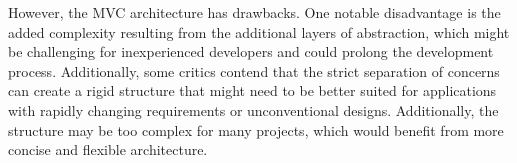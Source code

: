 However, the MVC architecture has drawbacks. One notable disadvantage is the
added complexity resulting from the additional layers of abstraction, which
might be challenging for inexperienced developers and could prolong the
development process. Additionally, some critics contend that the strict
separation of concerns can create a rigid structure that might need to be better
suited for applications with rapidly changing requirements or unconventional
designs. Additionally, the structure may be too complex for many projects, which
would benefit from more concise and flexible architecture.
